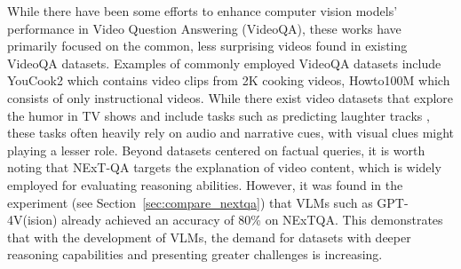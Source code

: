 \smallskip

\noindent While there have been some efforts to enhance computer vision models' performance in Video Question Answering (VideoQA), these works have primarily focused on the common, less surprising videos found in existing VideoQA datasets. Examples of commonly employed VideoQA datasets include YouCook2 \cite{zhou2018towards} which contains video clips from 2K cooking videos, Howto100M \cite{miech2019howto100m} which consists of only instructional videos.
While there exist video datasets that explore the humor in TV shows \cite{mustard, hasan-etal-2019-ur} and include tasks such as predicting laughter tracks \cite{Patro_2021_WACV}, these tasks often heavily rely on audio and narrative cues, with visual clues might playing a lesser role. Beyond datasets centered on factual queries, it is worth noting that NExT-QA targets the explanation of video content, which is widely employed for evaluating reasoning abilities. However, it was found in the experiment (see Section~\ref{sec:compare_nextqa}) that VLMs such as GPT-4V(ision) already achieved an accuracy of 80\% on NExTQA. This demonstrates that with the development of VLMs, the demand for datasets with deeper reasoning capabilities and presenting greater challenges is increasing.

